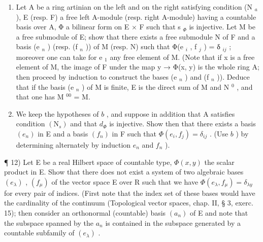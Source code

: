 \begin{enumerate}
\def\labelenumi{\alph{enumi})}
\setcounter{enumi}{1}
\item
  Let A be a ring artinian on the left and on the right satisfying condition (N \(_{a}\) ), E (resp. F) a free left A-module (resp. right A-module) having a countable basis over A, Φ a bilinear form on E × F such that s \(_{\Phi}\) is injective. Let M be a free submodule of E; show that there exists a free submodule N of F and a basis (e \(_{n}\) ) (resp. (f \(_{n}\) )) of M (resp. N) such that Φ(e \(_{i}\) , f \(_{j}\) ) = δ \(_{ij}\) ; moreover one can take for e \(_{1}\) any free element of M. (Note that if x is a free element of M, the image of F under the map y → Φ(x, y) is the whole ring A; then proceed by induction to construct the bases (e \(_{n}\) ) and (f \(_{n}\) )). Deduce that if the basis (e \(_{n}\) ) of M is finite, E is the direct sum of M and N \(^{0}\) , and that one has M \(^{00}\) = M.
\item
  We keep the hypotheses of \(b\) , and suppose in addition that A satisfies condition \((\mathrm{N}_{s})\) and that \(d_{\Phi}\) is injective. Show then that there exists a basis \((e_{n})\) in E and a basis \((f_{n})\) in F such that \(\Phi(e_{i}, f_{j}) = \delta_{ij}\) . (Use \(b\) ) by determining alternately by induction \(e_{n}\) and \(f_{n}\) ).
\end{enumerate}

¶ 12) Let E be a real Hilbert space of countable type, \(\Phi(x, y)\) the scalar product in E. Show that there does not exist a system of two algebraic bases \((e_{\lambda})\) , \((f_{\mu})\) of the vector space E over R such that we have \(\Phi(e_{\lambda}, f_{\mu}) = \delta_{\lambda y}\) for every pair of indices. (First note that the index set of these bases would have the cardinality of the continuum (Topological vector spaces, chap. II, § 3, exerc. 15); then consider an orthonormal (countable) basis \((a_n)\) of E and note that the subspace spanned by the \(a_n\) is contained in the subspace generated by a countable subfamily of \((e_{\lambda})\) .
\relax{}
